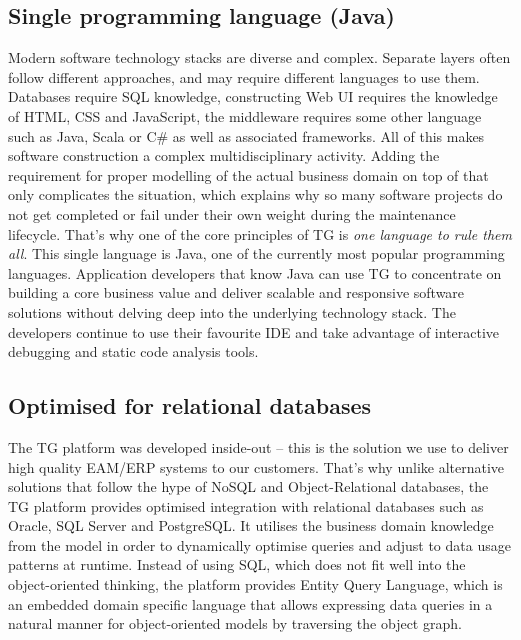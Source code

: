 \documentclass[a4paper,10pt,oneside,openright,final]{memoir} %
\begin{document}
\subsection*{Single programming language (Java)}
	Modern software technology stacks are diverse and complex.
	Separate layers often follow different approaches, and may require different languages to use them.
	Databases require SQL knowledge, constructing Web UI requires the knowledge of HTML, CSS and JavaScript, the middleware requires some other language such as Java, Scala or C\# as well as associated frameworks.
	All of this makes software construction a complex multidisciplinary activity.
	Adding the requirement for proper modelling of the actual business domain on top of that only complicates the situation, which explains why so many software projects do not get completed or fail under their own weight during the maintenance lifecycle.
	That's why one of the core principles of TG is \emph{one language to rule them all}.
	This single language is Java, one of the currently most popular programming languages.
	Application developers that know Java can use TG to concentrate on building a core business value and deliver scalable and responsive software solutions without delving deep into the underlying technology stack.
	The developers continue to use their favourite IDE and take advantage of interactive debugging and static code analysis tools.

\subsection*{Optimised for relational databases}
	The TG platform was developed inside-out -- this is the solution we use to deliver high quality EAM/ERP systems to our customers.
	That's why unlike alternative solutions that follow the hype of NoSQL and Object-Relational databases, the TG platform provides optimised integration with relational databases such as Oracle, SQL Server and PostgreSQL.
	It utilises the business domain knowledge from the model in order to dynamically optimise queries and adjust to data usage patterns at runtime.
	Instead of using SQL, which does not fit well into the object-oriented thinking, the platform provides Entity Query Language, which is an embedded domain specific language that allows expressing data queries in a natural manner for object-oriented models by traversing the object graph.
\end{document}
